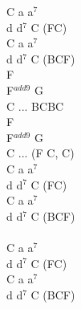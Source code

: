 \documentclass[a5paper, 10pt]{book}
\begin{document}
\begin{minipage}[t]{0.3\textwidth}
  C a a$^7$\\
  d d$^7$ C (FC)\\
  C a a$^7$\\
  d d$^7$ C (BCF)\\

  F\\
  F$^{add9}$ G\\
  C ... BCBC\\
  F\\
  F$^{add9}$ G\\
  C ... (F C, C)\\

  C a a$^7$\\
  d d$^7$ C (FC)\\
  C a a$^7$\\
  d d$^7$ C (BCF)\\

  ~\\

  C a a$^7$\\
  d d$^7$ C (FC)\\
  C a a$^7$\\
  d d$^7$ C (BCF)\\
  \hspace*{-0.4cm} \vspace*{-1.4cm}
\end{minipage}

\newpage
\end{document}
